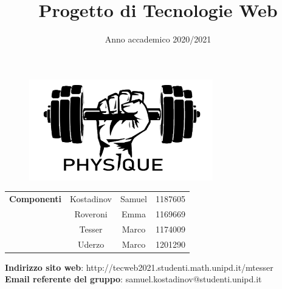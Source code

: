 
\title{Progetto di Tecnologie Web}
\author{}
\date{Anno accademico 2020/2021}


\maketitle
\begin{figure}[H]
	\centering
	\includegraphics[width=8cm]{img/logo.png}
\end{figure}
\begin{table}[H]
	\centering
	\begin{tabular}{c|c c c}
		\textbf{Componenti} & Kostadinov     & Samuel  & 1187605 \\
		                    & Roveroni       & Emma    & 1169669 \\
		                    & Tesser         & Marco   & 1174009 \\
		                    & Uderzo         & Marco   & 1201290 \\
	\end{tabular}
\end{table}

\begin{center}
	\textbf{Indirizzo sito web}: http://tecweb2021.studenti.math.unipd.it/mtesser\\
	\textbf{Email referente del gruppo}: samuel.kostadinov@studenti.unipd.it
\end{center}

